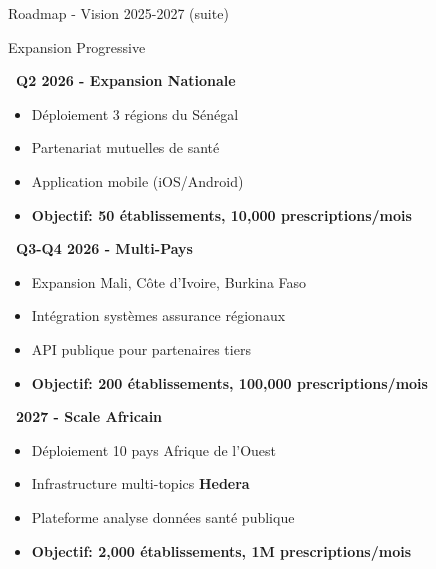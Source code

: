 \documentclass[aspectratio=169,11pt]{beamer}
\newcommand{\hedera}{\textbf{Hedera}\texttrademark}
\begin{document}
\begin{frame}{Roadmap - Vision 2025-2027 (suite)}

\begin{block}{Expansion Progressive}
\vspace{0.2cm}

\textbf{\faMapMarked~Q2 2026 - Expansion Nationale}
\begin{itemize}
    \item Déploiement 3 régions du Sénégal
    \item Partenariat mutuelles de santé
    \item Application mobile (iOS/Android)
    \item \textbf{Objectif: 50 établissements, 10,000 prescriptions/mois}
\end{itemize}

\vspace{0.2cm}

\textbf{\faGlobeAfrica~Q3-Q4 2026 - Multi-Pays}
\begin{itemize}
    \item Expansion Mali, Côte d'Ivoire, Burkina Faso
    \item Intégration systèmes assurance régionaux
    \item API publique pour partenaires tiers
    \item \textbf{Objectif: 200 établissements, 100,000 prescriptions/mois}
\end{itemize}

\vspace{0.2cm}

\textbf{\faChartLine~2027 - Scale Africain}
\begin{itemize}
    \item Déploiement 10 pays Afrique de l'Ouest
    \item Infrastructure multi-topics \hedera
    \item Plateforme analyse données santé publique
    \item \textbf{Objectif: 2,000 établissements, 1M prescriptions/mois}
\end{itemize}
\end{block}

\end{frame}
\end{document}
